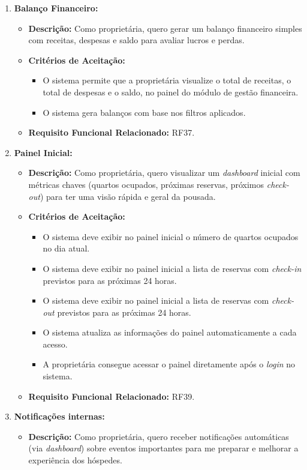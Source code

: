 \documentclass[
	12pt,				%
	openany,			%
	oneside,			%
	a4paper,			%
	english,			%
	french,				%
	spanish,			%
	brazil				%
	]{abntex2}
\begin{document}
\begin{enumerate}[label=\textbf{\arabic*.}]
	\item \textbf{Balanço Financeiro:}
	\begin{itemize}
		\item \textbf{Descrição:} Como proprietária, quero gerar um balanço financeiro simples com receitas, despesas e saldo para avaliar lucros e perdas.
		\item \textbf{Critérios de Aceitação:}
		\begin{itemize}
			\item O sistema permite que a proprietária visualize o total de receitas, o total de despesas e o saldo, no painel do módulo de gestão financeira.
			\item O sistema gera balanços com base nos filtros aplicados.
		\end{itemize}
		\item \textbf{Requisito Funcional Relacionado:} RF37.
	\end{itemize} 
	\item \textbf{Painel Inicial:}
	\begin{itemize}
		\item \textbf{Descrição:} Como proprietária, quero visualizar um \textit{dashboard} inicial com métricas chaves (quartos ocupados, próximas reservas, próximos \textit{check-out}) para ter uma visão rápida e geral da pousada.
		\item \textbf{Critérios de Aceitação:}
		\begin{itemize}
			\item O sistema deve exibir no painel inicial o número de quartos ocupados no dia atual.
			\item O sistema deve exibir no painel inicial a lista de reservas com \textit{check-in} previstos para as próximas 24 horas.
			\item O sistema deve exibir no painel inicial a lista de reservas com \textit{check-out} previstos para as próximas 24 horas.
			\item O sistema atualiza as informações do painel automaticamente a cada acesso.
			\item A proprietária consegue acessar o painel diretamente após o \textit{login} no sistema.
		\end{itemize}
		\item \textbf{Requisito Funcional Relacionado:} RF39.
	\end{itemize} 
	\item \textbf{Notificações internas:}
	\begin{itemize}
		\item \textbf{Descrição:} Como proprietária, quero receber notificações automáticas (via \textit{dashboard}) sobre eventos importantes para me preparar e melhorar a experiência dos hóspedes.

\end{itemize}
\end{enumerate}
\end{document}
